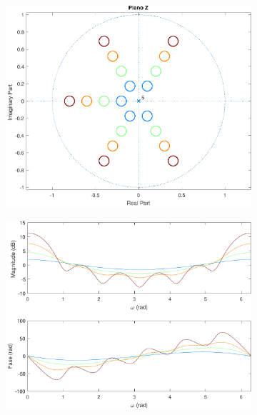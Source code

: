 \documentclass[a4paper,11pt]{article}
\numberwithin{figure}{section}
\numberwithin{equation}{section}
\numberwithin{table}{section}
\theoremstyle{definition}
\begin{document}
\begin{figure}[ht]
\begin{subfigure}{0.44\textwidth}
		\includegraphics[width=\textwidth]{ex_2_pz_6}
	\end{subfigure}
	\begin{subfigure}{0.44\textwidth}
		\includegraphics[width=\textwidth]{ex_2_bode_6}
	\end{subfigure}\\
	\begin{subfigure}{0.44\textwidth}

\end{subfigure}
\end{figure}
\end{document}
